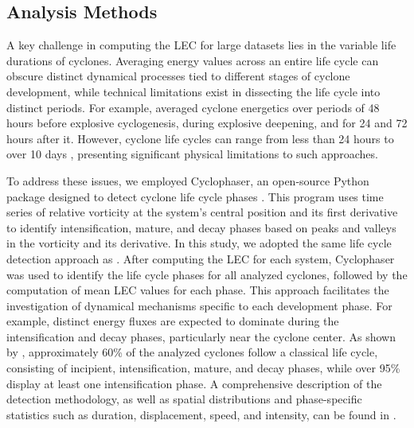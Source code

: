 \documentclass[pdflatex,sn-chicago]{sn-jnl}%
\theoremstyle{plain}
\theoremstyle{definition}
\theoremstyle{remark}
\theoremstyle{definition}
\begin{document}
\subsection{Analysis Methods}

A key challenge in computing the LEC for large datasets lies in the variable life durations of cyclones. Averaging energy values across an entire life cycle can obscure distinct dynamical processes tied to different stages of cyclone development, while technical limitations exist in dissecting the life cycle into distinct periods. For example, \citet{black2013universal} averaged cyclone energetics over periods of 48 hours before explosive cyclogenesis, during explosive deepening, and for 24 and 72 hours after it. However, cyclone life cycles can range from less than 24 hours to over 10 days \citep{trigo2006climatology,reboita2010south,gramcianinov2019properties}, presenting significant physical limitations to such approaches.

To address these issues, we employed Cyclophaser, an open-source Python package designed to detect cyclone life cycle phases \citep{de2025cyclophaser}. This program uses time series of relative vorticity at the system's central position and its first derivative to identify intensification, mature, and decay phases based on peaks and valleys in the vorticity and its derivative. In this study, we adopted the same life cycle detection approach as \citet{couto2024new}. After computing the LEC for each system, Cyclophaser was used to identify the life cycle phases for all analyzed cyclones, followed by the computation of mean LEC values for each phase. This approach facilitates the investigation of dynamical mechanisms specific to each development phase. For example, distinct energy fluxes are expected to dominate during the intensification and decay phases, particularly near the cyclone center. As shown by \citet{couto2024new}, approximately 60\% of the analyzed cyclones follow a classical life cycle, consisting of incipient, intensification, mature, and decay phases, while over 95\% display at least one intensification phase. A comprehensive description of the detection methodology, as well as spatial distributions and phase-specific statistics such as duration, displacement, speed, and intensity, can be found in \citet{couto2024new}.
\end{document}
